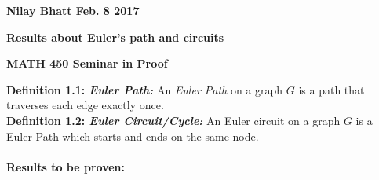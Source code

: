 \documentclass[12pt, fullpage]{article}
\begin{document}
\begin{flushleft}
\textbf{Nilay Bhatt Feb. 8 2017}		
\end{flushleft}
\begin{center}
	\textbf{Results about Euler's path and circuits}
\end{center}
\begin{center}
		
{\bf MATH 450 Seminar in Proof}
 \\
\end{center}
\textbf{Definition 1.1: \textit{Euler Path: }}An \textit{Euler Path} on a graph $G$ is a path that traverses each edge exactly once.\\
\textbf{Definition 1.2: \textit{Euler Circuit/Cycle: }}An Euler circuit on a graph $G$ is a Euler Path which starts and ends on the same node.\\ \\
\textbf{Results to be proven: }
\end{document}
